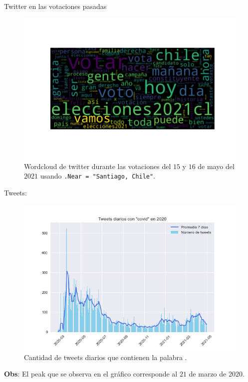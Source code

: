 \documentclass{beamer}
\begin{document}
	\begin{frame}{Twitter en las votaciones pasadas}
		\begin{figure}[h]
			\centering
			\includegraphics[scale=.5]{../imgs/wordcloud_chile_votaciones.png}
			\caption{Wordcloud de twitter durante las votaciones del $15$ y $16$ de mayo del $2021$ usando \texttt{.Near = "Santiago, Chile"}.}
		\end{figure}
	\end{frame}

	\begin{frame}{Tweets: } 
		\begin{figure}[h]
			\centering
			\includegraphics[scale=.4]{../imgs/serie_covid_2020.png}
			\caption{Cantidad de tweets diarios que contienen la palabra .}
		\end{figure}
		\textbf{Obs}: El peak que se observa en el gráfico corresponde al $21$ de marzo de $2020$.
	\end{frame}
\end{document}
